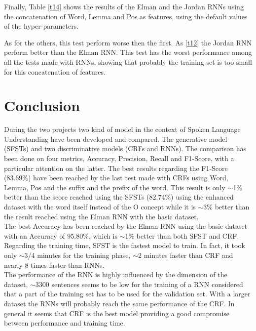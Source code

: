 \documentclass[11pt,a4paper]{article}
\begin{document}
Finally, Table \ref{t14} shows the results of the Elman and the Jordan RNNs using the concatenation of Word, Lemma and Pos as features, using the default values of the hyper-parameters.
\begin{table}[H]
    \begin{center}
    \end{center}
    \caption{\label{t14} Rnn Best score on Word + Lemma + Pos set}
\end{table}
As for the others, this test perform worse then the first. As \ref{t12} the Jordan RNN perform better than the Elman RNN. This test has the worst performance among all the tests made with RNNs, showing that probably the training set is too small for this concatenation of features.
\section{Conclusion}
During the two projects two kind of model in the context of Spoken Language Understanding have been developed and compared. The generative model (SFSTs) and
two discriminative models (CRFs and RNNs).
The comparison has been done on four metrics, Accuracy, Precision, Recall and F1-Score, with a particular attention on the latter.
The best results regarding the F1-Score (83.69\%) have been reached by the last test made with CRFs using Word, Lemma, Pos and the suffix and the prefix of the word. This result is only $\sim$1\% better than the score reached using the SFSTs (82.74\%) using the enhanced dataset with the word itself instead of the O concept while it is $\sim$3\% better than the result reached using the Elman RNN with the basic dataset.\\
The best Accuracy has been reached by the Elman RNN using the basic dataset with an Accuracy of 95.80\%, which is $\sim$1\% better than both SFST and CRF.\\
Regarding the training time, SFST is the fastest model to train. In fact, it took only $\sim$3/4 minutes for the training phase, $\sim$2 minutes faster than CRF and nearly 8 times faster than RNNs.\\
The performance of the RNN is highly influenced by the dimension of the dataset, $\sim$3300 sentences seems to be low for the training of a RNN considered  that a part of the training set has to be used for the validation set. With a larger dataset the RNNs will probably reach the same performance of the CRF.
In general it seems that CRF is the best model providing a good compromise between performance and training time.


\end{document}
